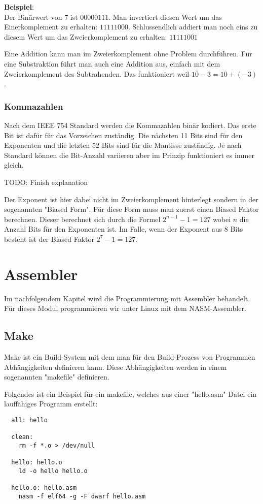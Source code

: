 \documentclass[12pt, a4paper, oneside]{article}
\begin{document}
{\bf Beispiel}:\\
Der Binärwert von $7$ ist $0000 0111$. Man invertiert diesen Wert um das Einerkomplement zu erhalten: $1111 1000$. Schlussendlich addiert man noch eins zu diesem Wert um das Zweierkomplement zu erhalten: $1111 1001$

Eine Addition kann man im Zweierkomplement ohne Problem durchführen. Für eine Substraktion führt man auch eine Addition aus, einfach mit dem Zweierkomplement des Subtrahenden. Das funktioniert weil $10 - 3 = 10 + (-3)$.

\subsubsection{Kommazahlen}
Nach dem IEEE 754 Standard werden die Kommazahlen binär kodiert. Das erste Bit ist dafür für das Vorzeichen zuständig. Die nächsten 11 Bits sind für den Exponenten und die letzten 52 Bits sind für die Mantisse zuständig. Je nach Standard können die Bit-Anzahl variieren aber im Prinzip funktioniert es immer gleich.

TODO: Finish explanation

Der Exponent ist hier dabei nicht im Zweierkomplement hinterlegt sondern in der sogenannten "Biased Form". Für diese Form muss man zuerst einen Biased Faktor berechnen. Dieser berechnet sich durch die Formel $2^{n-1}-1 = 127$ wobei $n$ die Anzahl Bits für den Exponenten ist. Im Falle, wenn der Exponent aus 8 Bits besteht ist der Biased Faktor $2^{7} -1 = 127$.

\newpage
\section{Assembler}
Im nachfolgendem Kapitel wird die Programmierung mit Assembler behandelt. Für dieses Modul programmieren wir unter Linux mit dem NASM-Assembler.

\subsection{Make}
Make ist ein Build-System mit dem man für den Build-Prozess von Programmen Abhängigkeiten definieren kann. Diese Abhängigkeiten werden in einem sogenannten "makefile" definieren.

Folgendes ist ein Beispiel für ein makefile, welches aus einer "hello.asm" Datei ein lauffähiges Programm erstellt:
\begin{verbatim} 
  all: hello
  
  clean:
    rm -f *.o > /dev/null
  
  hello: hello.o 
    ld -o hello hello.o
  
  hello.o: hello.asm
    nasm -f elf64 -g -F dwarf hello.asm
\end{verbatim}
\end{document}
